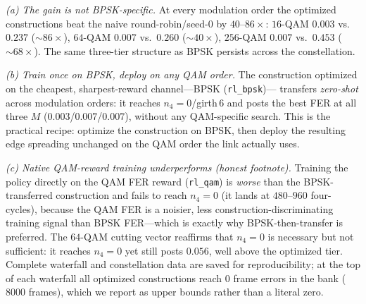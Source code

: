 \documentclass[journal]{IEEEtran}
\begin{document}
\emph{(a) The gain is not BPSK-specific.} At every modulation order the optimized
constructions beat the naive round-robin/seed-0 by $40$--$86\times$: $16$-QAM
$0.003$ vs.\ $0.237$ ($\sim\!86\times$), $64$-QAM $0.007$ vs.\ $0.260$
($\sim\!40\times$), $256$-QAM $0.007$ vs.\ $0.453$ ($\sim\!68\times$). The same
three-tier structure as BPSK persists across the constellation.

\emph{(b) Train once on BPSK, deploy on any QAM order.} The construction
optimized on the cheapest, sharpest-reward channel---BPSK (\texttt{rl\_bpsk})---
transfers \emph{zero-shot} across modulation orders: it reaches $n_4{=}0$/girth\,$6$
and posts the best FER at all three $M$ ($0.003$/$0.007$/$0.007$), without any
QAM-specific search. This is the practical recipe: optimize the construction on
BPSK, then deploy the resulting edge spreading unchanged on the QAM order the link
actually uses.

\emph{(c) Native QAM-reward training underperforms (honest footnote).} Training
the policy directly on the QAM FER reward (\texttt{rl\_qam}) is \emph{worse} than
the BPSK-transferred construction and fails to reach $n_4{=}0$ (it lands at
$480$--$960$ four-cycles), because the QAM FER is a noisier, less
construction-discriminating training signal than BPSK FER---which is exactly why
BPSK-then-transfer is preferred. The $64$-QAM cutting vector reaffirms that
$n_4{=}0$ is necessary but not sufficient: it reaches $n_4{=}0$ yet still posts
$0.056$, well above the optimized tier. Complete waterfall and constellation data
are saved for reproducibility; at the top of each waterfall all optimized
constructions reach $0$ frame errors in the bank ($8000$ frames), which we report
as upper bounds rather than a literal zero.
\end{document}
